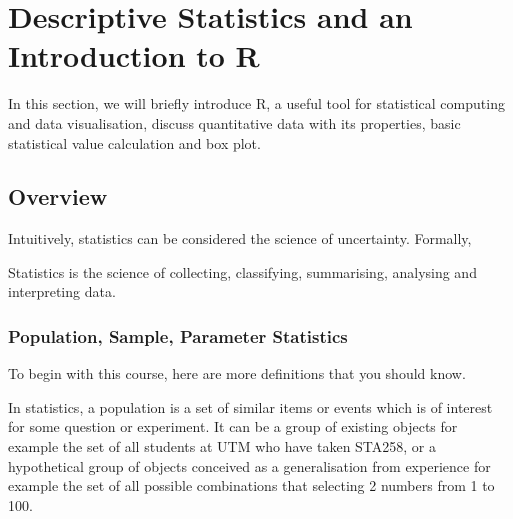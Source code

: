 \chapter{Descriptive Statistics and an Introduction to R}
\label{sec.matrix}
\pagestyle{myheadings}  

In this section, we will briefly introduce R, a useful tool for statistical computing and data visualisation, discuss quantitative data with its properties, basic statistical value calculation and box plot.\\

\section{Overview}


Intuitively, statistics can be considered the science of uncertainty. Formally,

\begin{definition}[Statistics]	
Statistics is the science of collecting, classifying, summarising, analysing and interpreting data.
\end{definition}

\subsection{Population, Sample, Parameter Statistics}

To begin with this course, here are more definitions that you should know.

\begin{definition}[Population]	
In statistics, a population is a set of similar items or events which is of interest for some question or experiment. It can be a group of existing objects for example the set of all students at UTM who have taken STA258, or a hypothetical group of objects conceived as a generalisation from experience for example the set of all possible combinations that selecting 2 numbers from 1 to 100.
\end{definition}


